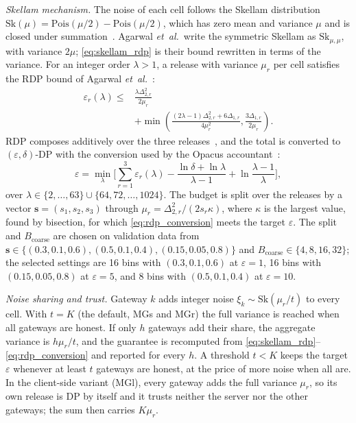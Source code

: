 \textit{Skellam mechanism.} The noise of each cell follows the Skellam distribution $\mathrm{Sk}(\mu) = \mathrm{Pois}(\mu/2) - \mathrm{Pois}(\mu/2)$, which has zero mean and variance $\mu$ and is closed under summation~\cite{agarwal2021}. Agarwal \textit{et~al.}\ write the symmetric Skellam as $\mathrm{Sk}_{\mu,\mu}$, with variance $2\mu$; \eqref{eq:skellam_rdp} is their bound rewritten in terms of the variance. For an integer order $\lambda > 1$, a release with variance $\mu_r$ per cell satisfies the RDP bound of Agarwal \textit{et~al.}~\cite[Cor.~3.6]{agarwal2021}:
\begin{equation}
\begin{aligned}
\varepsilon_r(\lambda) \le{}& \frac{\lambda \Delta_{2,r}^2}{2\mu_r} \\
&+ \min\!\left( \frac{(2\lambda - 1)\Delta_{2,r}^2 + 6\Delta_{1,r}}{4\mu_r^2}, \frac{3\Delta_{1,r}}{2\mu_r} \right).
\end{aligned}
\label{eq:skellam_rdp}
\end{equation}
RDP composes additively over the three releases~\cite{mironov2017rdp}, and the total is converted to $(\varepsilon, \delta)$-DP with the conversion used by the Opacus accountant~\cite{yousefpour2021}:
\begin{equation}
\varepsilon = \min_{\lambda} \Big[ \sum_{r=1}^{3} \varepsilon_r(\lambda) - \frac{\ln \delta + \ln \lambda}{\lambda - 1} + \ln \frac{\lambda - 1}{\lambda} \Big],
\label{eq:rdp_conversion}
\end{equation}
over $\lambda \in \{2, \dots, 63\} \cup \{64, 72, \dots, 1024\}$. The budget is split over the releases by a vector $\mathbf{s} = (s_1, s_2, s_3)$ through $\mu_r = \Delta_{2,r}^2 / (2 s_r \kappa)$, where $\kappa$ is the largest value, found by bisection, for which \eqref{eq:rdp_conversion} meets the target $\varepsilon$. The split and $B_{\mathrm{coarse}}$ are chosen on validation data from $\mathbf{s} \in \{(0.3, 0.1, 0.6), (0.5, 0.1, 0.4), (0.15, 0.05, 0.8)\}$ and $B_{\mathrm{coarse}} \in \{4, 8, 16, 32\}$; the selected settings are 16 bins with $(0.3, 0.1, 0.6)$ at $\varepsilon = 1$, 16 bins with $(0.15, 0.05, 0.8)$ at $\varepsilon = 5$, and 8 bins with $(0.5, 0.1, 0.4)$ at $\varepsilon = 10$.

\textit{Noise sharing and trust.} Gateway $k$ adds integer noise $\xi_k \sim \mathrm{Sk}(\mu_r / t)$ to every cell. With $t = K$ (the default, MGs and MGr) the full variance is reached when all gateways are honest. If only $h$ gateways add their share, the aggregate variance is $h\mu_r/t$, and the guarantee is recomputed from \eqref{eq:skellam_rdp}--\eqref{eq:rdp_conversion} and reported for every $h$. A threshold $t < K$ keeps the target $\varepsilon$ whenever at least $t$ gateways are honest, at the price of more noise when all are. In the client-side variant (MGl), every gateway adds the full variance $\mu_r$, so its own release is DP by itself and it trusts neither the server nor the other gateways; the sum then carries $K\mu_r$.

